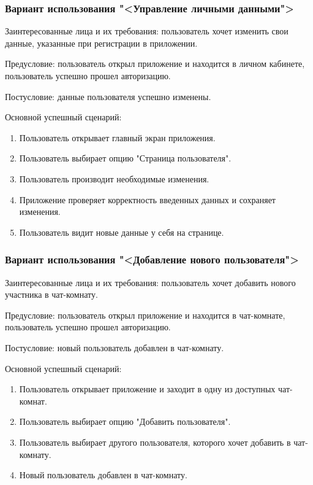 \subsubsection{Вариант использования "<Управление личными данными">}

Заинтересованные лица и их требования: пользователь хочет изменить свои данные, указанные при регистрации в приложении.

Предусловие: пользователь открыл приложение и находится в личном кабинете, пользователь успешно прошел авторизацию.

Постусловие: данные пользователя успешно изменены.

Основной успешный сценарий:

\begin{enumerate}
	\item Пользователь открывает главный экран приложения.
	\item Пользователь выбирает опцию "Страница пользователя".
	\item Пользователь производит необходимые изменения.
	\item Приложение проверяет корректность введенных данных и сохраняет изменения.
	\item Пользователь видит новые данные у себя на странице.
\end{enumerate}

\subsubsection{Вариант использования "<Добавление нового пользователя">}

Заинтересованные лица и их требования: пользователь хочет добавить нового участника в чат-комнату.

Предусловие: пользователь открыл приложение и находится в чат-комнате, пользователь успешно прошел авторизацию.

Постусловие: новый пользователь добавлен в чат-комнату.

Основной успешный сценарий:

\begin{enumerate}
	\item Пользователь открывает приложение и заходит в одну из доступных чат-комнат.
	\item Пользователь выбирает опцию "Добавить пользователя".
	\item Пользователь выбирает другого пользователя, которого хочет добавить в чат-комнату.
	\item Новый пользователь добавлен в чат-комнату.
\end{enumerate}

